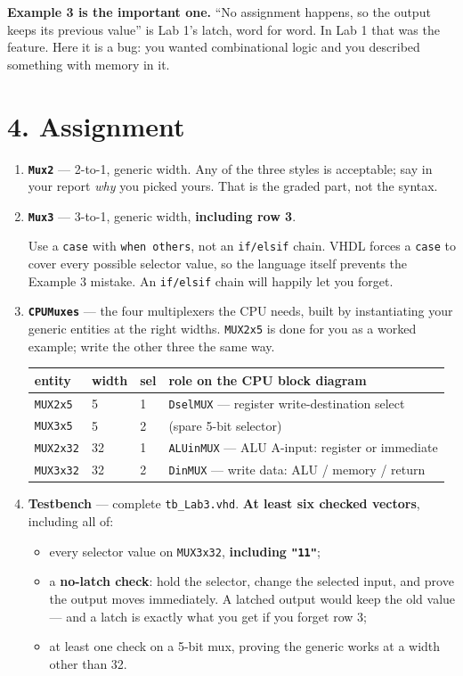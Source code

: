 \documentclass[11pt]{article}
\newcommand{\code}[1]{\texttt{#1}}
\begin{document}
\textbf{Example 3 is the important one.} ``No assignment happens, so the output
keeps its previous value'' is Lab 1's latch, word for word. In Lab 1 that was the
feature. Here it is a bug: you wanted combinational logic and you described
something with memory in it.

\section*{4. Assignment}

\begin{enumerate}[leftmargin=2em,itemsep=3pt]
\item \textbf{\code{Mux2}} --- 2-to-1, generic width. Any of the three styles is
acceptable; say in your report \emph{why} you picked yours. That is the graded
part, not the syntax.

\item \textbf{\code{Mux3}} --- 3-to-1, generic width, \textbf{including row 3}.

Use a \code{case} with \code{when others}, not an \code{if/elsif} chain. VHDL
forces a \code{case} to cover every possible selector value, so the language
itself prevents the Example 3 mistake. An \code{if/elsif} chain will happily let
you forget.

\item \textbf{\code{CPUMuxes}} --- the four multiplexers the CPU needs, built by
instantiating your generic entities at the right widths.
\code{MUX2x5} is done for you as a worked example; write the other three the same
way.

\begin{center}
\begin{tabular}{llll}
\toprule
entity & width & sel & role on the CPU block diagram \\
\midrule
\code{MUX2x5}  & 5  & 1 & \code{DselMUX} --- register write-destination select \\
\code{MUX3x5}  & 5  & 2 & (spare 5-bit selector) \\
\code{MUX2x32} & 32 & 1 & \code{ALUinMUX} --- ALU A-input: register or immediate \\
\code{MUX3x32} & 32 & 2 & \code{DinMUX} --- write data: ALU / memory / return \\
\bottomrule
\end{tabular}
\end{center}

\item \textbf{Testbench} --- complete \code{tb\_Lab3.vhd}. \textbf{At least six
checked vectors}, including all of:
\begin{itemize}[leftmargin=1.4em,itemsep=1pt]
\item every selector value on \code{MUX3x32}, \textbf{including \code{"11"}};
\item a \textbf{no-latch check}: hold the selector, change the selected input,
and prove the output moves immediately. A latched output would keep the old
value --- and a latch is exactly what you get if you forget row 3;
\item at least one check on a 5-bit mux, proving the generic works at a width
other than 32.
\end{itemize}
\end{enumerate}
\end{document}
